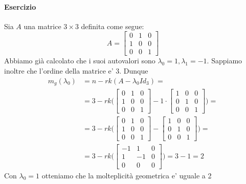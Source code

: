 \documentclass[a4paper, 10pt]{article}
\begin{document}
	\paragraph*{Esercizio}
	Sia $A$ una matrice $3 \times 3$ definita come segue:
	\[A = \begin{bmatrix} 0 & 1 & 0 \\ 1 & 0 & 0 \\ 0 & 0 & 1 \end{bmatrix} \]
	Abbiamo già calcolato che i suoi autovalori sono $\lambda_0 = 1, \lambda_1 = -1$. Sappiamo inoltre che l'ordine della 
	matrice e' 3. Dunque
	\begin{equation*}
		\begin{split}
			m_g(\lambda_0) &= n - rk(A - \lambda_0 Id_3) = \\
			&= 3 - rk \biggl( \begin{bmatrix} 0 & 1 & 0 \\ 1 & 0 & 0 \\ 0 & 0 & 1  \end{bmatrix} - 1 \cdot 
			   \begin{bmatrix} 1 & 0 & 0 \\ 0 & 1 & 0 \\ 0 & 0 & 1 \end{bmatrix} \biggr) = \\
			&= 3 - rk \biggl( \begin{bmatrix} 0 & 1 & 0 \\ 1 & 0 & 0 \\ 0 & 0 & 1  \end{bmatrix} -  
			   \begin{bmatrix} 1 & 0 & 0 \\ 0 & 1 & 0 \\ 0 & 0 & 1 \end{bmatrix} \biggr) =  \\
			 &= 3 - rk \biggl( \begin{bmatrix} -1 & 1 & 0 \\ 1 & -1 & 0 \\ 0 & 0 & 0  \end{bmatrix}  \biggr)  = 3 - 1 = 2
		\end{split}
	\end{equation*}
	Con $\lambda_0 = 1$ otteniamo che la molteplicità geometrica e' uguale a 2
\end{document}
